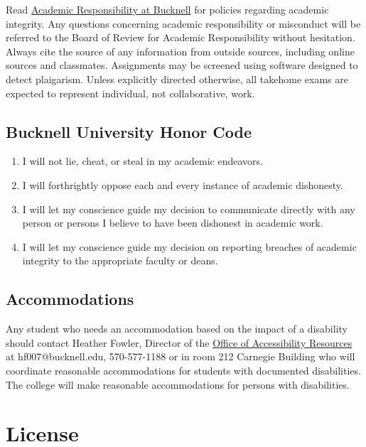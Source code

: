 \documentclass[11pt]{article} %
\begin{document}
    Read \href{"http://www.bucknell.edu/AcademicResponsibility.xml"}{Academic Responsibility at Bucknell} for policies regarding academic integrity. Any questions concerning academic responsibility or misconduct will be referred to the Board of Review for Academic Responsibility without hesitation. Always cite the source of any information from outside sources, including online sources and classmates. Assignments may be screened using software designed to detect plaigarism. Unless explicitly directed otherwise, all takehome exams are expected to represent individual, not collaborative, work.
  
  \subsection{Bucknell University Honor Code}
  \begin{enumerate}
  \item I will not lie, cheat, or steal in my academic endeavors.
  \item I will forthrightly oppose each and every instance of academic dishonesty.
  \item I will let my conscience guide my decision to communicate directly with any person or persons I believe to have been dishonest in academic work.
  \item I will let my conscience guide my decision on reporting breaches of academic integrity to the appropriate faculty or deans.
\end{enumerate}

  \subsection{Accommodations}
  
  Any student who needs an accommodation based on the impact of a disability should contact Heather Fowler, Director of the \href{https://www.bucknell.edu/about-bucknell/accessibility-resources/services-and-resources-for-students/academic-accommodations}{Office of Accessibility Resources} at hf007@bucknell.edu, 570-577-1188 or in room 212 Carnegie Building who will coordinate reasonable accommodations for students with documented disabilities. The college will make reasonable accommodations for persons with disabilities. 


\section{License}
  
\end{document}
